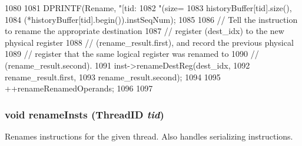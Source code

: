 \begin{DoxyCode}
{{1080 
1081         DPRINTF(Rename, "[tid:%
1082                 "(size=%
1083                 historyBuffer[tid].size(),
1084                 (*historyBuffer[tid].begin()).instSeqNum);
1085 
1086         // Tell the instruction to rename the appropriate destination
1087         // register (dest_idx) to the new physical register
1088         // (rename_result.first), and record the previous physical
1089         // register that the same logical register was renamed to
1090         // (rename_result.second).
1091         inst->renameDestReg(dest_idx,
1092                             rename_result.first,
1093                             rename_result.second);
1094 
1095         ++renameRenamedOperands;
1096     }
1097 }
\end{DoxyCode}
\hypertarget{classDefaultRename_a8ff86a7781da8390490774c08b1819f2}{
\subsubsection[{renameInsts}]{\setlength{\rightskip}{0pt plus 5cm}void renameInsts ({\bf ThreadID} {\em tid})}}
\label{classDefaultRename_a8ff86a7781da8390490774c08b1819f2}
Renames instructions for the given thread. Also handles serializing instructions. 


